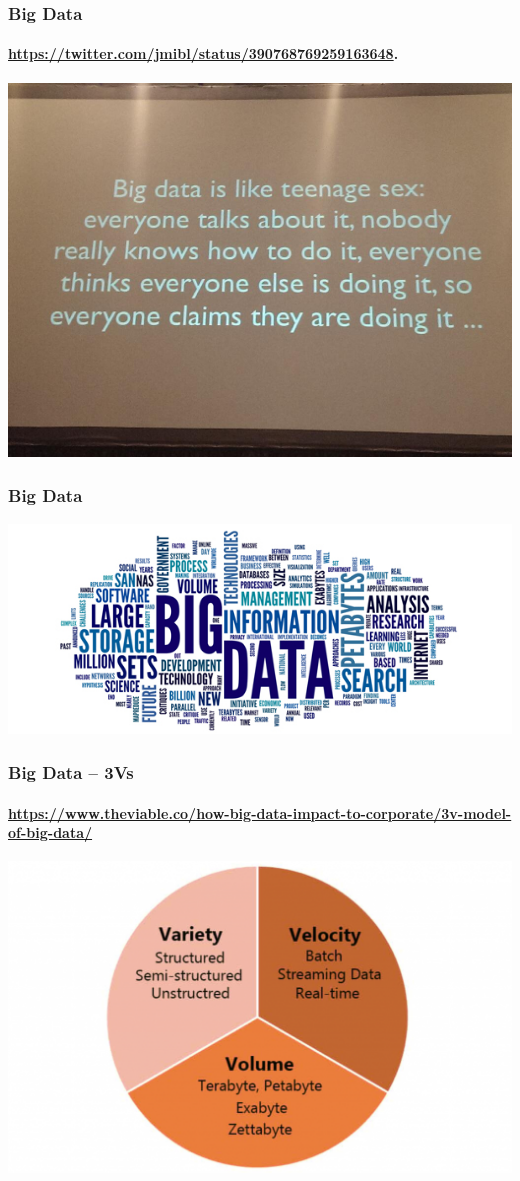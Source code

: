 \documentclass[14pt]{beamer}
\begin{document}
\begin{frame}
  \frametitle{Big Data}
  \framesubtitle{\url{https://twitter.com/jmibl/status/390768769259163648}.}
\centering\includegraphics[width=.9\textwidth]{img/big_data_sex}
\end{frame}

\begin{frame}
  \frametitle{Big Data}
  \centering\includegraphics[width=\textwidth]{img/bigdata1}
\end{frame}

\begin{frame}
  \frametitle{Big Data -- 3Vs}
  \framesubtitle{\url{https://www.theviable.co/how-big-data-impact-to-corporate/3v-model-of-big-data/}}
\centering\includegraphics[width=\textwidth]{img/3v}
\end{frame}
\end{document}
